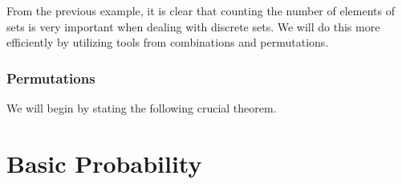 \documentclass[
]{book}
\begin{document}
From the previous example, it is clear that counting the number of elements of sets is very important when dealing with discrete sets. We will do this more efficiently by utilizing tools from combinations and permutations.

\hypertarget{permutations}{%
\subsection{Permutations}\label{permutations}}

We will begin by stating the following crucial theorem.

\hypertarget{basic-probability}{%
\chapter{Basic Probability}\label{basic-probability}}
\end{document}
